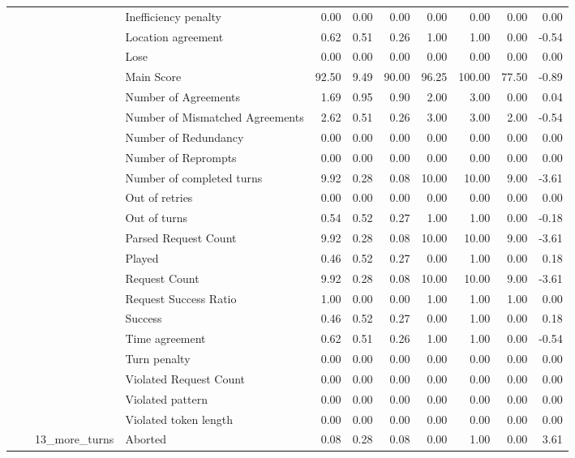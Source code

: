 \begin{tabular}{llllrrrrrrr}
 &  &  & Inefficiency penalty & 0.00 & 0.00 & 0.00 & 0.00 & 0.00 & 0.00 & 0.00 \\
 &  &  & Location agreement & 0.62 & 0.51 & 0.26 & 1.00 & 1.00 & 0.00 & -0.54 \\
 &  &  & Lose & 0.00 & 0.00 & 0.00 & 0.00 & 0.00 & 0.00 & 0.00 \\
 &  &  & Main Score & 92.50 & 9.49 & 90.00 & 96.25 & 100.00 & 77.50 & -0.89 \\
 &  &  & Number of Agreements & 1.69 & 0.95 & 0.90 & 2.00 & 3.00 & 0.00 & 0.04 \\
 &  &  & Number of Mismatched Agreements & 2.62 & 0.51 & 0.26 & 3.00 & 3.00 & 2.00 & -0.54 \\
 &  &  & Number of Redundancy & 0.00 & 0.00 & 0.00 & 0.00 & 0.00 & 0.00 & 0.00 \\
 &  &  & Number of Reprompts & 0.00 & 0.00 & 0.00 & 0.00 & 0.00 & 0.00 & 0.00 \\
 &  &  & Number of completed turns & 9.92 & 0.28 & 0.08 & 10.00 & 10.00 & 9.00 & -3.61 \\
 &  &  & Out of retries & 0.00 & 0.00 & 0.00 & 0.00 & 0.00 & 0.00 & 0.00 \\
 &  &  & Out of turns & 0.54 & 0.52 & 0.27 & 1.00 & 1.00 & 0.00 & -0.18 \\
 &  &  & Parsed Request Count & 9.92 & 0.28 & 0.08 & 10.00 & 10.00 & 9.00 & -3.61 \\
 &  &  & Played & 0.46 & 0.52 & 0.27 & 0.00 & 1.00 & 0.00 & 0.18 \\
 &  &  & Request Count & 9.92 & 0.28 & 0.08 & 10.00 & 10.00 & 9.00 & -3.61 \\
 &  &  & Request Success Ratio & 1.00 & 0.00 & 0.00 & 1.00 & 1.00 & 1.00 & 0.00 \\
 &  &  & Success & 0.46 & 0.52 & 0.27 & 0.00 & 1.00 & 0.00 & 0.18 \\
 &  &  & Time agreement & 0.62 & 0.51 & 0.26 & 1.00 & 1.00 & 0.00 & -0.54 \\
 &  &  & Turn penalty & 0.00 & 0.00 & 0.00 & 0.00 & 0.00 & 0.00 & 0.00 \\
 &  &  & Violated Request Count & 0.00 & 0.00 & 0.00 & 0.00 & 0.00 & 0.00 & 0.00 \\
 &  &  & Violated pattern & 0.00 & 0.00 & 0.00 & 0.00 & 0.00 & 0.00 & 0.00 \\
 &  &  & Violated token length & 0.00 & 0.00 & 0.00 & 0.00 & 0.00 & 0.00 & 0.00 \\
\cline{3-11}
 &  & \multirow[t]{27}{*}{13_more_turns} & Aborted & 0.08 & 0.28 & 0.08 & 0.00 & 1.00 & 0.00 & 3.61 \\

\end{tabular}
